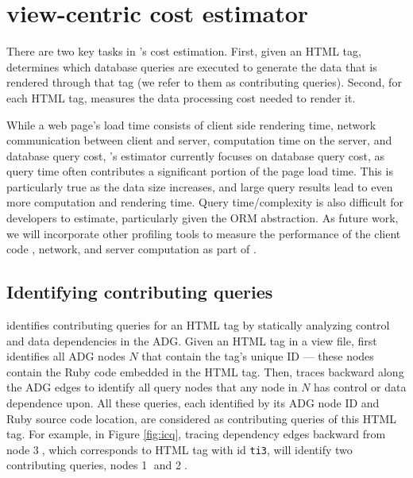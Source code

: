 \section{\ToolP view-centric cost estimator} 
\label{sec:profile}

There are two key tasks in \ToolP's cost estimation. First, given an HTML tag,
\ToolP determines which database queries are executed
to generate the data that is rendered through that tag (we refer to them as contributing queries). 
Second, for each HTML tag, \ToolP measures the data processing cost needed to render it.

While a web page's load time consists of client side rendering time,
network communication between client and server, 
computation time on the server, and database query cost,
\ToolP's estimator currently focuses on database query cost, as query time often contributes a significant portion of the page load time. This is particularly true as the data size increases, and large query results lead to even more computation and rendering time. 
Query time/complexity is also
difficult for developers to estimate, particularly given the ORM abstraction.
As future work, we will incorporate other profiling tools to measure the performance of 
the client code \cite{chromeDev}, network, and server computation as part of \ToolP.


\subsection{Identifying contributing queries}
\ToolP identifies contributing queries for an HTML tag by statically analyzing
control and data dependencies in the ADG. Given an HTML tag in a view file, 
\ToolP first identifies all ADG nodes $N$ that contain the tag's unique ID ---
these nodes contain the Ruby code embedded in the HTML tag. Then, \ToolP 
 traces backward along the ADG edges to
identify all query nodes that any node in $N$ has control or data dependence upon. 
All these queries, each identified by its ADG node ID and Ruby source code
location, are considered as contributing queries of this HTML tag. 
For example, in Figure \ref{fig:icq}, tracing dependency edges backward from node 
{\large \textcircled{\small 3}}, which corresponds to HTML tag with id {\tt ti3}, %
will identify two contributing queries, nodes {\large \textcircled{\small 1}} and 
{\large \textcircled{\small 2}}.


